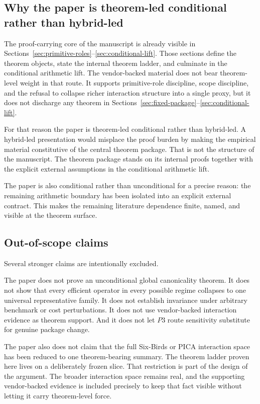 \subsection*{Why the paper is theorem-led conditional rather than hybrid-led}

The proof-carrying core of the manuscript is already visible in
Sections~\ref{sec:primitive-roles}--\ref{sec:conditional-lift}. Those sections
define the theorem objects, state the internal theorem ladder, and culminate in
the conditional arithmetic lift. The vendor-backed material does not bear
theorem-level weight in that route. It supports primitive-role discipline, scope
discipline, and the refusal to collapse richer interaction structure into a
single proxy, but it does not discharge any theorem in
Sections~\ref{sec:fixed-package}--\ref{sec:conditional-lift}.

For that reason the paper is theorem-led conditional rather than hybrid-led. A
hybrid-led presentation would misplace the proof burden by making the empirical
material constitutive of the central theorem package. That is not the structure
of the manuscript. The theorem package stands on its internal proofs together
with the explicit external assumptions in the conditional arithmetic lift.

The paper is also conditional rather than unconditional for a precise reason:
the remaining arithmetic boundary has been isolated into an explicit external
contract. This makes the remaining literature dependence finite, named, and
visible at the theorem surface.

\subsection*{Out-of-scope claims}

Several stronger claims are intentionally excluded.

The paper does not prove an unconditional global canonicality theorem. It does
not show that every efficient operator in every possible regime collapses to one
universal representative family. It does not establish invariance under
arbitrary benchmark or cost perturbations. It does not use vendor-backed
interaction evidence as theorem support. And it does not let \(P3\) route
sensitivity substitute for genuine package change.

The paper also does not claim that the full Six-Birds or PICA interaction space
has been reduced to one theorem-bearing summary. The theorem ladder proven here
lives on a deliberately frozen slice. That restriction is part of the design of
the argument. The broader interaction space remains real, and the supporting
vendor-backed evidence is included precisely to keep that fact visible without
letting it carry theorem-level force.

